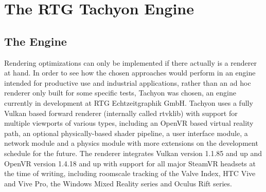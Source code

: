 
\chapter{The RTG Tachyon Engine} \label{tachyon}

\section{The Engine}
Rendering optimizations can only be implemented if there actually is a renderer at hand. In order to see how the chosen approaches would perform in an engine intended for productive use and industrial applications, rather than an ad hoc renderer only built for some specific tests, Tachyon was chosen, an engine currently in development at RTG Echtzeitgraphik GmbH. Tachyon uses a fully Vulkan based forward renderer (internally called rtvklib) with support for multiple viewports of various types, including an OpenVR based virtual reality path, an optional physically-based shader pipeline, a user interface module, a network module and a physics module with more extensions on the development schedule for the future. The renderer integrates Vulkan version 1.1.85 and up and OpenVR version 1.4.18 and up with support for all major SteamVR headsets at the time of writing, including roomscale tracking of the Valve Index, HTC Vive and Vive Pro, the Windows Mixed Reality series and Oculus Rift series. 

